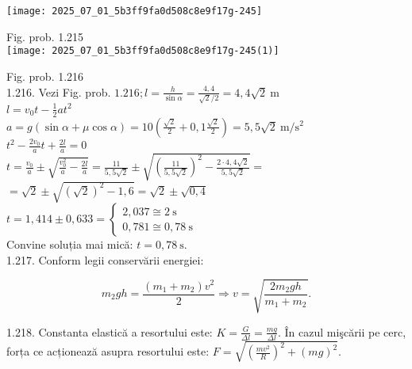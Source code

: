 \begin{center}
\texttt{[image: 2025\_07\_01\_5b3ff9fa0d508c8e9f17g-245]}
\end{center}

Fig. prob. 1.215\\
\texttt{[image: 2025\_07\_01\_5b3ff9fa0d508c8e9f17g-245(1)]}

Fig. prob. 1.216\\
1.216. Vezi Fig. prob. $1.216 ; l=\frac{h}{\sin \alpha}=\frac{4,4}{\sqrt{2} / 2}=4,4 \sqrt{2} \mathrm{~m}$\\
$l=v_{0} t-\frac{1}{2} a t^{2}$\\
$a=g(\sin \alpha+\mu \cos \alpha)=10\left(\frac{\sqrt{2}}{2}+0,1 \frac{\sqrt{2}}{2}\right)=5,5 \sqrt{2} \mathrm{~m} / \mathrm{s}^{2}$\\
$t^{2}-\frac{2 v_{0}}{a} t+\frac{2 l}{a}=0$\\
$t=\frac{v_{0}}{a} \pm \sqrt{\frac{v_{0}^{2}}{a}-\frac{2 l}{a}}=\frac{11}{5,5 \sqrt{2}} \pm \sqrt{\left(\frac{11}{5,5 \sqrt{2}}\right)^{2}-\frac{2 \cdot 4,4 \sqrt{2}}{5,5 \sqrt{2}}}=$\\
$=\sqrt{2} \pm \sqrt{(\sqrt{2})^{2}-1,6}=\sqrt{2} \pm \sqrt{0,4}$\\
$t=1,414 \pm 0,633=\left\{\begin{array}{l}2,037 \cong 2 \mathrm{~s} \\ 0,781 \cong 0,78 \mathrm{~s}\end{array}\right.$\\
Convine soluția mai mică: $t=0,78 \mathrm{~s}$.\\
1.217. Conform legii conservării energiei:

$$
m_{2} g h=\frac{\left(m_{1}+m_{2}\right) v^{2}}{2} \Rightarrow v=\sqrt{\frac{2 m_{2} g h}{m_{1}+m_{2}}} .
$$

1.218. Constanta elastică a resortului este: $K=\frac{G}{\Delta l}=\frac{m g}{\Delta l}$. În cazul mişcării pe cerc, forța ce acționează asupra resortului este: $F=\sqrt{\left(\frac{m v^{2}}{R}\right)^{2}+(m g)^{2}}$.

